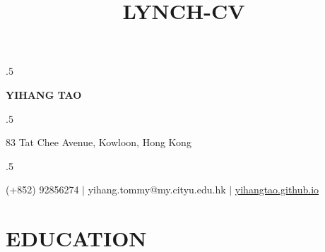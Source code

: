 \documentclass[letterpaper,11pt]{article}
\title{LYNCH-CV}
\begin{document}


\moveleft.5\hoffset\centerline{\LARGE\bf YIHANG TAO}


 
\moveleft.5\hoffset\centerline{\large 83 Tat Chee Avenue, Kowloon, Hong Kong}
\moveleft.5\hoffset\centerline{\large(+852) 92856274 $|$ yihang.tommy@my.cityu.edu.hk $|$ \href{https://yihangtao.github.io}{yihangtao.github.io}}



\vspace{1mm}
\section{\textbf{EDUCATION}}
\vspace{1mm}
\end{document}
